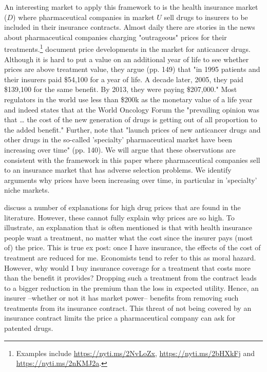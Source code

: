 \documentclass[12pt,english,a4paper]{article}
\begin{document}
An interesting market to apply this framework to is the health insurance market (\(D\)) where pharmaceutical companies in market \(U\) sell drugs to insurers to be included in their insurance contracts. Almost daily there are stories in the news about pharmaceutical companies charging "outrageous" prices for their treatments.\footnote{Examples include \url{https://nyti.ms/2NvLoZx}, \url{https://nyti.ms/2bHXkFj} and \url{https://nyti.ms/2nKMJ2a}.} \cite{Howard2015} document price developments in the market for anticancer drugs. Although it is hard to put a value on an additional year of life to see whether prices are above treatment value, they argue (pp. 149) that "in 1995 patients and their insurers paid \$54,100 for a year of life. A decade later, 2005, they paid \$139,100 for the same benefit. By 2013, they were paying \$207,000." Most regulators in the world use less than \$200k as the monetary value of a life year and indeed \cite{cavalli-2013-appeal-to} states that at the World Oncology Forum the "prevailing opinion was that \ldots{} the cost of the new generation of drugs is getting out of all proportion to the added benefit." Further, \cite{Howard2015} note that "launch prices of new anticancer drugs and other drugs in the so-called 'specialty' pharmaceutical market have been increasing over time" (pp. 140). We will argue that these observations are consistent with the framework in this paper where pharmaceutical companies sell to an insurance market that has adverse selection problems. We identify arguments why prices have been increasing over time, in particular in 'specialty' niche markets.

\cite{Howard2015} discuss a number of explanations for high drug prices that are found in the literature. However,  these cannot fully explain why prices are so high. To illustrate, an explanation that is often mentioned is that with health insurance people want a treatment, no matter what the cost since the insurer pays (most of) the price. This is true ex post: once I have insurance, the effects of the cost of treatment are reduced for me. Economists tend to refer to this as moral hazard. However, why would I buy insurance coverage for a treatment that costs more than the benefit it provides? Dropping such a treatment from the contract leads to a bigger reduction in the premium than the loss in expected utility. Hence, an insurer --whether or not it has market power-- benefits from removing such treatments from its insurance contract. This threat of not being covered by an insurance contract limits the price a pharmaceutical company can ask for patented drugs.
\end{document}
